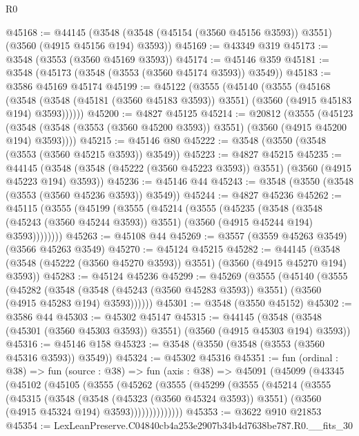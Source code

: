\begin{lexlean}{R0}
\begin{coremodule}
@45168 := @44145
    (@3548 (@3548 (@45154 (@3560 @45156 @3593)) @3551) (@3560 (@4915 @45156 @194) @3593))
@45169 := @43349 @319
@45173 := @3548 (@3553 (@3560 @45169 @3593))
@45174 := @45146 @359
@45181 := @3548 (@45173 (@3548 (@3553 (@3560 @45174 @3593)) @3549))
@45183 := @3586 @45169 @45174
@45199 := @45122
    (@3555
      (@45140
        (@3555
          (@45168
            (@3548
              (@3548 (@45181 (@3560 @45183 @3593)) @3551)
              (@3560 (@4915 @45183 @194) @3593))))))
@45200 := @4827 @45125
@45214 := @20812
    (@3555
      (@45123 (@3548 (@3548 (@3553 (@3560 @45200 @3593)) @3551) (@3560 (@4915 @45200 @194) @3593))))
@45215 := @45146 @80
@45222 := @3548 (@3550 (@3548 (@3553 (@3560 @45215 @3593)) @3549))
@45223 := @4827 @45215
@45235 := @44145
    (@3548 (@3548 (@45222 (@3560 @45223 @3593)) @3551) (@3560 (@4915 @45223 @194) @3593))
@45236 := @45146 @44
@45243 := @3548 (@3550 (@3548 (@3553 (@3560 @45236 @3593)) @3549))
@45244 := @4827 @45236
@45262 := @45115
    (@3555
      (@45199
        (@3555
          (@45214
            (@3555
              (@45235
                (@3548
                  (@3548 (@45243 (@3560 @45244 @3593)) @3551)
                  (@3560 (@4915 @45244 @194) @3593))))))))
@45263 := @45108 @44
@45269 := @3557 (@3559 @45263 @3549) (@3566 @45263 @3549)
@45270 := @45124 @45215
@45282 := @44145
    (@3548 (@3548 (@45222 (@3560 @45270 @3593)) @3551) (@3560 (@4915 @45270 @194) @3593))
@45283 := @45124 @45236
@45299 := @45269
    (@3555
      (@45140
        (@3555
          (@45282
            (@3548
              (@3548 (@45243 (@3560 @45283 @3593)) @3551)
              (@3560 (@4915 @45283 @194) @3593))))))
@45301 := @3548 (@3550 @45152)
@45302 := @3586 @44
@45303 := @45302 @45147
@45315 := @44145
    (@3548 (@3548 (@45301 (@3560 @45303 @3593)) @3551) (@3560 (@4915 @45303 @194) @3593))
@45316 := @45146 @158
@45323 := @3548 (@3550 (@3548 (@3553 (@3560 @45316 @3593)) @3549))
@45324 := @45302 @45316
@45351 := fun (ordinal : @38) =>
  fun (source : @38) =>
  fun (axis : @38) =>
  @45091
    (@45099
      (@43345
        (@45102
          (@45105
            (@3555
              (@45262
                (@3555
                  (@45299
                    (@3555
                      (@45214
                        (@3555
                          (@45315
                            (@3548
                              (@3548 (@45323 (@3560 @45324 @3593)) @3551)
                              (@3560 (@4915 @45324 @194) @3593))))))))))))))
@45353 := @3622 @910 @21853
@45354 := LexLeanPreserve.C04840cb4a253e2907b34b4d7638be787.R0.__fits_30

\end{coremodule}
\end{lexlean}
